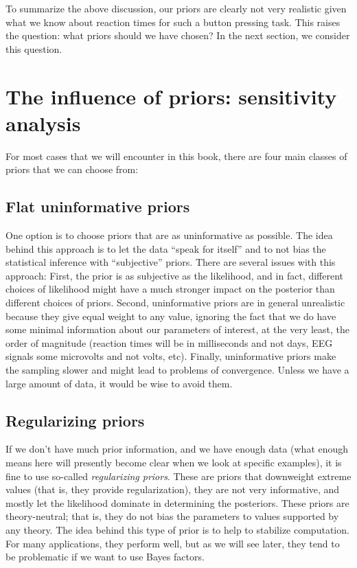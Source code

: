 \documentclass[12pt,]{krantz}
\theoremstyle{definition}
\theoremstyle{definition}
\theoremstyle{definition}
\theoremstyle{remark}
\begin{document}
To summarize the above discussion, our priors are clearly not very
realistic given what we know about reaction times for such a button
pressing task. This raises the question: what priors should we have
chosen? In the next section, we consider this question.

\section{The influence of priors: sensitivity
analysis}\label{sec:sensitivity}

For most cases that we will encounter in this book, there are four main
classes of priors that we can choose from:

\subsection{Flat uninformative priors}\label{flat-uninformative-priors}

One option is to choose priors that are as uninformative as possible.
The idea behind this approach is to let the data ``speak for itself''
and to not bias the statistical inference with ``subjective'' priors.
There are several issues with this approach: First, the prior is as
subjective as the likelihood, and in fact, different choices of
likelihood might have a much stronger impact on the posterior than
different choices of priors. Second, uninformative priors are in general
unrealistic because they give equal weight to any value, ignoring the
fact that we do have some minimal information about our parameters of
interest, at the very least, the order of magnitude (reaction times will
be in milliseconds and not days, EEG signals some microvolts and not
volts, etc). Finally, uninformative priors make the sampling slower and
might lead to problems of convergence. Unless we have a large amount of
data, it would be wise to avoid them.

\subsection{Regularizing priors}\label{regularizing-priors}

If we don't have much prior information, and we have enough data (what
enough means here will presently become clear when we look at specific
examples), it is fine to use so-called \emph{regularizing priors}. These
are priors that downweight extreme values (that is, they provide
regularization), they are not very informative, and mostly let the
likelihood dominate in determining the posteriors. These priors are
theory-neutral; that is, they do not bias the parameters to values
supported by any theory. The idea behind this type of prior is to help
to stabilize computation. For many applications, they perform well, but
as we will see later, they tend to be problematic if we want to use
Bayes factors.
\end{document}
